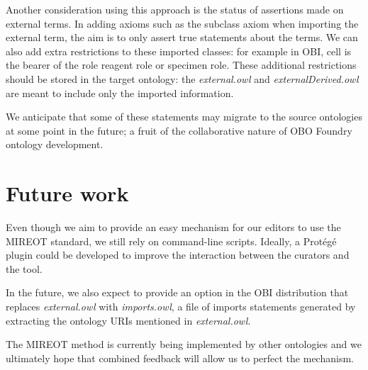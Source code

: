 \documentclass[a4paper,10pt,twocolumn]{article}
\newcommand{\protege}{Prot\'{e}g\'{e}}
\begin{document}

Another consideration using this approach is the status of assertions made on external terms.
In adding axioms such as the subclass axiom when importing the external term, the aim is to only assert true statements about the terms.
We can also add extra restrictions to these imported classes: for example in OBI, cell is the bearer of the role reagent role or specimen role. 
These additional restrictions should be stored in the target ontology: the \emph{external.owl} and \emph{externalDerived.owl} are meant to include only the imported information.

We anticipate that some of these statements may migrate to the source ontologies at some point in the future; a fruit of the collaborative nature of OBO Foundry ontology development. 

\section*{Future work}
Even though we aim to provide an easy mechanism for our editors to use the MIREOT standard, we still rely on command-line scripts.
Ideally, a \protege\ \cite{RefWorks:1501} plugin could be developed to improve the interaction between the curators and the tool.

In the future, we also expect to provide an option in the OBI distribution that replaces \emph{external.owl} with \emph{imports.owl}, a file of imports statements generated by extracting the ontology URIs mentioned in \emph{external.owl}.

The MIREOT method is currently being implemented by other ontologies and we ultimately hope that combined feedback will allow us to perfect the mechanism.
\end{document}
